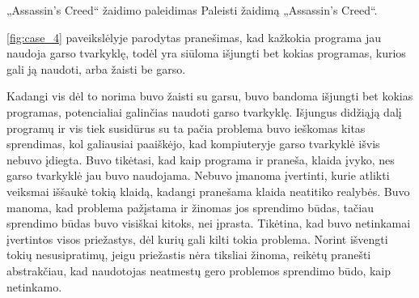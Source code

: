 ﻿\begin{xcase}{„Assassin's Creed“ žaidimo paleidimas}
  \xcgoal
  {
    Paleisti žaidimą „Assassin's Creed“.
  }
  \xctools
  {
    \ref{fig:case_4} paveikslėlyje parodytas pranešimas, kad kažkokia programa jau naudoja 
    garso tvarkyklę, todėl yra siūloma išjungti bet kokias programas, kurios gali ją naudoti, 
    arba žaisti be garso.

  }
  \xcresult
  {
    Kadangi vis dėl to norima buvo žaisti su garsu, buvo bandoma išjungti bet kokias programas,
    potencialiai galinčias naudoti garso tvarkyklę. Išjungus didžiąją dalį programų ir vis tiek 
    susidūrus su  ta pačia problema buvo ieškomas kitas sprendimas, kol galiausiai paaiškėjo, 
    kad kompiuteryje garso tvarkyklė išvis nebuvo įdiegta.
  }
  \xcprinciples
  {
    {
      Buvo tikėtasi, kad kaip programa ir praneša, klaida įvyko, nes garso tvarkyklė jau 
      buvo naudojama.
    }
    {
      Nebuvo įmanoma įvertinti, kurie atlikti veiksmai iššaukė tokią klaidą, kadangi pranešama 
      klaida neatitiko realybės.
    }
    {
      Buvo manoma, kad problema pažįstama ir žinomas jos sprendimo būdas, tačiau sprendimo 
      būdas buvo visiškai kitoks, nei įprasta.
    }
  }
  \xcthoughts
  {
    Tikėtina, kad buvo netinkamai įvertintos visos priežastys, dėl kurių gali kilti tokia 
    problema. Norint išvengti tokių nesusipratimų, jeigu priežastis nėra tiksliai žinoma, 
    reikėtų pranešti abstrakčiau, kad naudotojas neatmestų gero problemos sprendimo būdo, 
    kaip netinkamo.
  }
\end{xcase}

